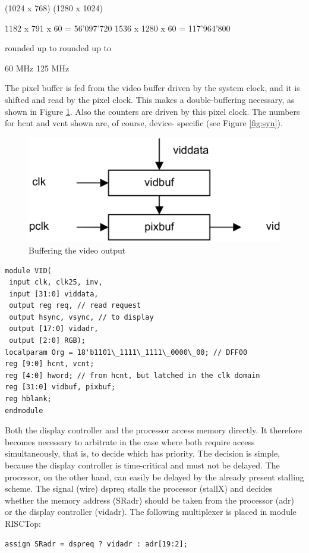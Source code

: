 (1024 x 768)
(1280 x 1024)

1182 x 791 x 60 = 56'097'720
1536 x 1280 x 60 = 117'964'800

rounded up to
rounded up to

60 MHz
125 MHz

The pixel buffer is fed from the video buffer driven by the system clock, and it is shifted and read by
the pixel clock. This makes a double-buffering necessary, as shown in Figure \ref{fig:vo}. Also the
counters are driven by this pixel clock. The numbers for hcnt and vcnt shown are, of course, device-
specific (see Figure \ref{fig:syn}).
\begin{figure}[h!]
  \centering
  \includegraphics[width=.6\textwidth]{i/G/a.png}
  \caption{Buffering the video output}
  \label{fig:vo}
\end{figure}

\begin{verbatim}
module VID(
 input clk, clk25, inv,
 input [31:0] viddata,
 output reg req, // read request
 output hsync, vsync, // to display
 output [17:0] vidadr,
 output [2:0] RGB);
localparam Org = 18'b1101\_1111\_1111\_0000\_00; // DFF00
reg [9:0] hcnt, vcnt;
reg [4:0] hword; // from hcnt, but latched in the clk domain
reg [31:0] vidbuf, pixbuf;
reg hblank;
endmodule
\end{verbatim}

Both the display controller and the processor access memory directly. It therefore becomes
necessary to arbitrate in the case where both require access simultaneously, that is, to decide
which has priority. The decision is simple, because the display controller is time-critical and must
not be delayed. The processor, on the other hand, can easily be delayed by the already present
stalling scheme. The signal (wire) dspreq stalls the processor (stallX) and decides whether the
memory address (SRadr) should be taken from the processor (adr) or the display controller
(vidadr). The following multiplexer is placed in module RISCTop:

\begin{verbatim}
assign SRadr = dspreq ? vidadr : adr[19:2];
\end{verbatim}

